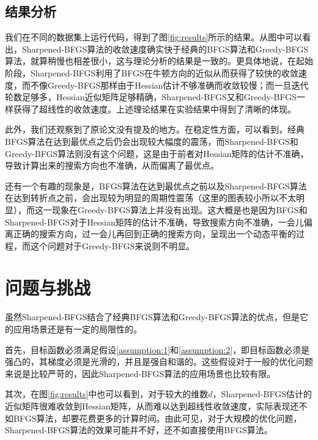 \documentclass[a4paper,twoside,AutoFakeBold]{article}
\theoremstyle{definition}
\begin{document}
\subsection{结果分析}
我们在不同的数据集上运行代码，得到了图\ref{fig:results}所示的结果。从图中可以看出，Sharpened-BFGS算法的收敛速度确实快于经典的BFGS算法和Greedy-BFGS算法，就算稍慢也相差很小，这与理论分析的结果是一致的。更具体地说，在起始阶段，Sharpened-BFGS利用了BFGS在牛顿方向的近似从而获得了较快的收敛速度，而不像Greedy-BFGS那样由于Hessian估计不够准确而收敛较慢；而一旦迭代轮数足够多，Hessian近似矩阵足够精确，Sharpened-BFGS又和Greedy-BFGS一样获得了超线性的收敛速度。上述理论结果在实验结果中得到了清晰的体现。

此外，我们还观察到了原论文没有提及的地方。在稳定性方面，可以看到，经典BFGS算法在达到最优点之后仍会出现较大幅度的震荡，而Sharpened-BFGS和Greedy-BFGS算法则没有这个问题，这是由于前者对Hessian矩阵的估计不准确，导致计算出来的搜索方向也不准确，从而偏离了最优点。

还有一个有趣的现象是，BFGS算法在达到最优点之前以及Sharpened-BFGS算法在达到转折点之前，会出现较为明显的周期性震荡（这里的图表较小所以不太明显），而这一现象在Greedy-BFGS算法上并没有出现。这大概是也是因为BFGS和Sharpened-BFGS对于Hessian矩阵的估计不准确，导致搜索方向不准确，一会儿偏离正确的搜索方向，过一会儿再回到正确的搜索方向，呈现出一个动态平衡的过程，而这个问题对于Greedy-BFGS来说则不明显。

%
\section{问题与挑战}\label{section:problem}
虽然Sharpened-BFGS结合了经典BFGS算法和Greedy-BFGS算法的优点，但是它的应用场景还是有一定的局限性的。

首先，目标函数必须满足假设\ref{assumption:1}和\ref{assumption:2}，即目标函数必须是强凸的，其梯度必须是光滑的，并且是强自和谐的。这些假设对于一般的优化问题来说是比较严苛的，因此Sharpened-BFGS算法的应用场景也比较有限。

其次，在图\ref{fig:results}中也可以看到，对于较大的维数$d$，Sharpened-BFGS估计的近似矩阵很难收敛到Hessian矩阵，从而难以达到超线性收敛速度，实际表现还不如BFGS算法，却要花费更多的计算时间。由此可见，对于大规模的优化问题，Sharpened-BFGS算法的效果可能并不好，还不如直接使用BFGS算法。
%
\end{document}
